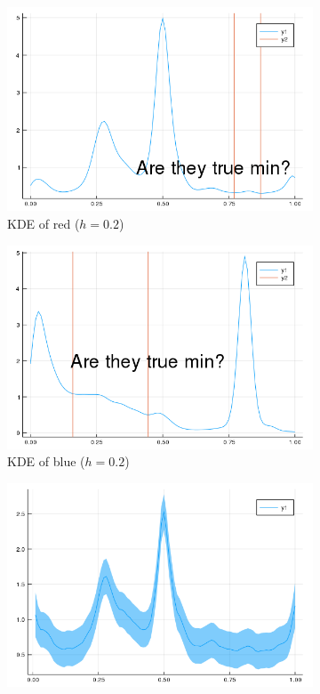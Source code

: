 \documentclass{article}
\begin{document}
\begin{figure}[htb]
  \centering
  \begin{subfigure}[b]{0.24\linewidth}
    \includegraphics[width=\linewidth]{images/fake_min_r.png}
    \caption{KDE of red ($h=0.2$)}
  \end{subfigure}
  \begin{subfigure}[b]{0.24\linewidth}
    \includegraphics[width=\linewidth]{images/fake_min_b.png}
    \caption{KDE of blue ($h=0.2$)}
  \end{subfigure}
  \begin{subfigure}[b]{0.24\linewidth}
    \includegraphics[width=\linewidth]{images/kde_reg_r.png}

\end{subfigure}
\end{figure}
\end{document}
